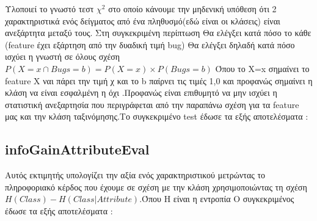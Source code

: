   \newpage
 
 Υλοποιεί το γνωστό τεστ $\chi^2 $ στο οποίο κάνουμε την μηδενική υπόθεση ότι  2 χαρακτηριστικά ενός δείγματος από ένα πληθυσμό(εδώ είναι οι κλάσεις)    είναι ανεξάρτητα μεταξύ τους.
Στη συγκεκριμένη περίπτωση Θα ελέγξει κατά πόσο το κάθε (feature έχει εξάρτηση από την δυαδική τιμή bug)
Θα ελέγξει δηλαδή  κατά πόσο ισχύει η γνωστή σε όλους σχέση $P(X=x \cap Bugs = b) = P(X=x)\times P(Bugs =b)$
Όπου το X=x σημαίνει το feature Χ ναι πάρει την τιμή χ και το b  παίρνει τις τιμές 1,0 και προφανώς σημαίνει η κλάση να είναι εσφαλμένη η όχι .Προφανώς είναι επιθυμητό να μην ισχύει η στατιστική ανεξαρτησία που περιγράφεται από την παραπάνω σχέση για τα feature μας και την κλάση ταξινόμησης.Το συγκεκριμένο test έδωσε τα εξής αποτελέσματα :

\subsection{infoGainAttributeΕval}
Αυτός εκτιμητής υπολογίζει την αξία ενός χαρακτηριστικού μετρώντας το πληροφοριακό κέρδος που έχουμε σε σχέση με την κλάση χρησιμοποιώντας τη σχέση  $H(Class) - H(Class | Attribute)$.Όπου H είναι η εντροπία 
Ο συγκεκριμένος έδωσε τα εξής αποτελέσματα :\\


